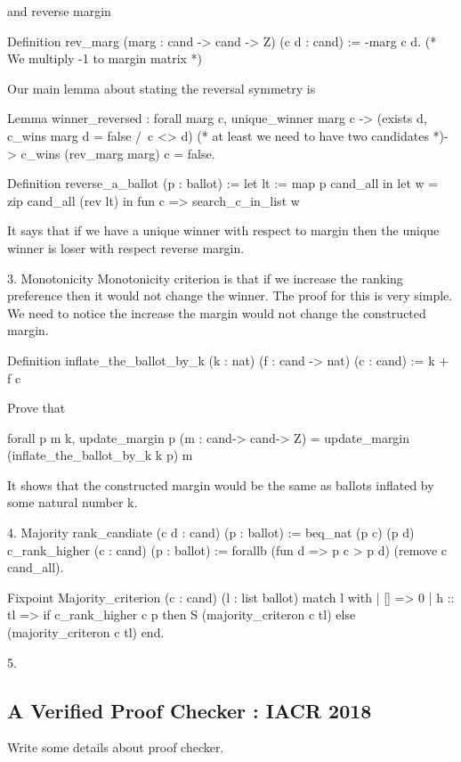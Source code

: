       and reverse margin 
      
       Definition rev_marg (marg : cand -> cand -> Z) (c d : cand) :=
      -marg c d. (* We multiply -1 to margin matrix *)
      
      Our main lemma about stating the reversal symmetry is 
      
      Lemma winner_reversed :
      forall marg c, unique_winner marg c ->
               (exists d, c_wins marg d = false /\ c <> d) (* at least we need to have two candidates *)->
               c_wins (rev_marg marg) c = false.
               
     Definition reverse_a_ballot (p : ballot) := 
     let lt := map p cand_all in 
	 let w = zip cand_all (rev lt) in 
	 fun c => search_c_in_list w     
     
   It says that if we have a unique winner with respect to margin then 
   the unique winner is loser with respect reverse margin.
   
   3. Monotonicity
	Monotonicity criterion is that if we increase the ranking preference then it would not change the winner. 
	The proof for this is very simple. We need to notice the increase the margin would not change the constructed margin. 
	
	
	Definition inflate_the_ballot_by_k (k : nat) (f : cand -> nat) (c : cand) := k + f c 
	
	Prove that 
	
	forall p m k, update_margin p (m : cand-> cand-> Z) = update_margin (inflate_the_ballot_by_k k p) m 
	
	It shows that the constructed margin would be the same as ballots inflated by some natural number k. 
	
 4. Majority
	rank_candiate (c d : cand) (p : ballot) := beq_nat (p c) (p d)
	c_rank_higher (c : cand) (p : ballot) := forallb (fun d =>  p c > p d) (remove c cand_all). 

	
	Fixpoint Majority_criterion (c : cand) (l : list ballot) 
	match l with 
	| [] => 0
	| h :: tl => if c_rank_higher c p then S (majority_criteron c tl) else (majority_criteron c tl)
	end. 
	
	
 5. 
	
	
   
  	\subsection{A Verified Proof Checker : IACR 2018}
  	Write some details about proof checker.
  
